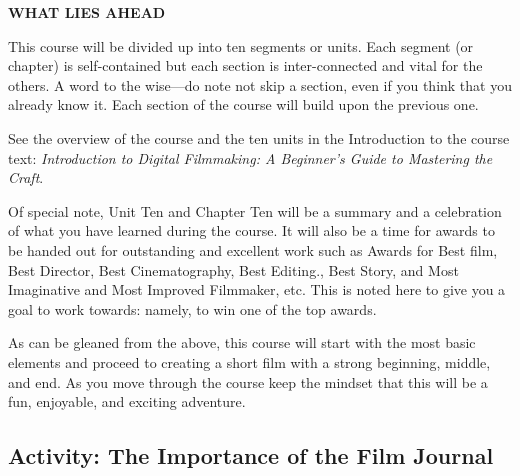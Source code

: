 \documentclass[
  letterpaper,
  DIV=11,
  numbers=noendperiod]{scrreprt}
\begin{document}
\textbf{WHAT LIES AHEAD}

This course will be divided up into ten segments or units. Each segment
(or chapter) is self-contained but each section is inter-connected and
vital for the others. A word to the wise---do note not skip a section,
even if you think that you already know it. Each section of the course
will build upon the previous one.

See the overview of the course and the ten units in the Introduction to
the course text: \emph{Introduction to Digital Filmmaking: A Beginner's
Guide to Mastering the Craft}.

Of special note, Unit Ten and Chapter Ten will be a summary and a
celebration of what you have learned during the course. It will also be
a time for awards to be handed out for outstanding and excellent work
such as Awards for Best film, Best Director, Best Cinematography, Best
Editing., Best Story, and Most Imaginative and Most Improved Filmmaker,
etc. This is noted here to give you a goal to work towards: namely, to
win one of the top awards.

As can be gleaned from the above, this course will start with the most
basic elements and proceed to creating a short film with a strong
beginning, middle, and end. As you move through the course keep the
mindset that this will be a fun, enjoyable, and exciting adventure.

\subsection{Activity: The Importance of the Film
Journal}\label{activity-the-importance-of-the-film-journal}
\end{document}
